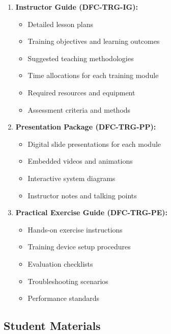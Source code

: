 \documentclass[12pt,a4paper,twoside,openright]{book}
\begin{document}
\begin{enumerate}
    \item \textbf{Instructor Guide (DFC-TRG-IG):}
    \begin{itemize}
        \item Detailed lesson plans
        \item Training objectives and learning outcomes
        \item Suggested teaching methodologies
        \item Time allocations for each training module
        \item Required resources and equipment
        \item Assessment criteria and methods
    \end{itemize}
    
    \item \textbf{Presentation Package (DFC-TRG-PP):}
    \begin{itemize}
        \item Digital slide presentations for each module
        \item Embedded videos and animations
        \item Interactive system diagrams
        \item Instructor notes and talking points
    \end{itemize}
    
    \item \textbf{Practical Exercise Guide (DFC-TRG-PE):}
    \begin{itemize}
        \item Hands-on exercise instructions
        \item Training device setup procedures
        \item Evaluation checklists
        \item Troubleshooting scenarios
        \item Performance standards
    \end{itemize}
\end{enumerate}

\subsection{Student Materials}
\end{document}
